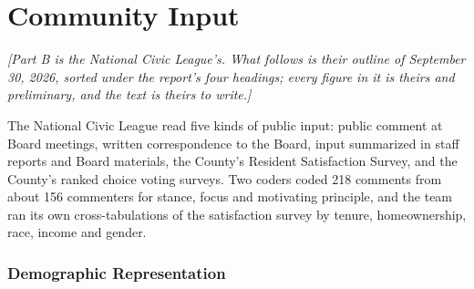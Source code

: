 \part{Community Input}
\sectionbreaksfalse  %


\textit{[Part B is the National Civic League's. What follows is their
outline of September 30, 2026, sorted under the report's four headings; every
figure in it is theirs and preliminary, and the text is theirs to write.]}

The National Civic League read five kinds of public input: public comment at
Board meetings, written correspondence to the Board, input summarized in staff
reports and Board materials, the County's Resident Satisfaction Survey, and the
County's ranked choice voting surveys. Two coders coded 218 comments from about
156 commenters for stance, focus and motivating principle, and the team ran its
own cross-tabulations of the satisfaction survey by tenure, homeownership, race,
income and gender. %

\section{Demographic Representation}

